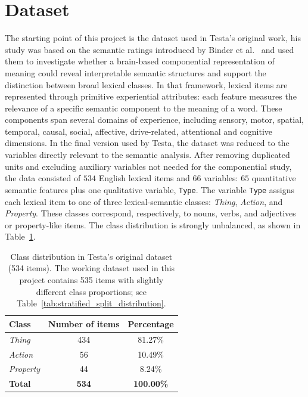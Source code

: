 \documentclass{ipgpmaster}
\begin{document}
\section{Dataset}
\label{sec:dataset}
The starting point of this project is the dataset used in Testa's original work, his study was based on the semantic ratings introduced by Binder et al.~\cite{binder2016toward} and used them to investigate whether a brain-based componential representation of meaning could reveal interpretable semantic structures and support the distinction between broad lexical classes. In that framework, lexical items are represented through primitive experiential attributes: each feature measures the relevance of a specific semantic component to the meaning of a word. These components span several domains of experience, including sensory, motor, spatial, temporal, causal, social, affective, drive-related, attentional and cognitive dimensions. In the final version used by Testa, the dataset was reduced to the variables directly relevant to the semantic analysis. After removing duplicated units and excluding auxiliary variables not needed for the componential study, the data consisted of \(534\) English lexical items and \(66\) variables: \(65\) quantitative semantic features plus one qualitative variable, \texttt{Type}. The variable \texttt{Type} assigns each lexical item to one of three lexical-semantic classes: \emph{Thing}, \emph{Action}, and \emph{Property}. These classes correspond, respectively, to nouns, verbs, and adjectives or property-like items. The class distribution is strongly unbalanced, as shown in Table~\ref{tab:dataset-class-distribution}.

\begin{table}[H]
\centering
\begin{tabular}{lcc}
\hline
\textbf{Class} & \textbf{Number of items} & \textbf{Percentage} \\
\hline
\emph{Thing} & 434 & 81.27\% \\
\emph{Action} & 56 & 10.49\% \\
\emph{Property} & 44 & 8.24\% \\
\hline
\textbf{Total} & \textbf{534} & \textbf{100.00\%} \\
\hline
\end{tabular}
\caption{Class distribution in Testa's original dataset (534 items). The working dataset used in this project contains 535 items with slightly different class proportions; see Table~\ref{tab:stratified_split_distribution}.}
\label{tab:dataset-class-distribution}
\end{table}
\end{document}
